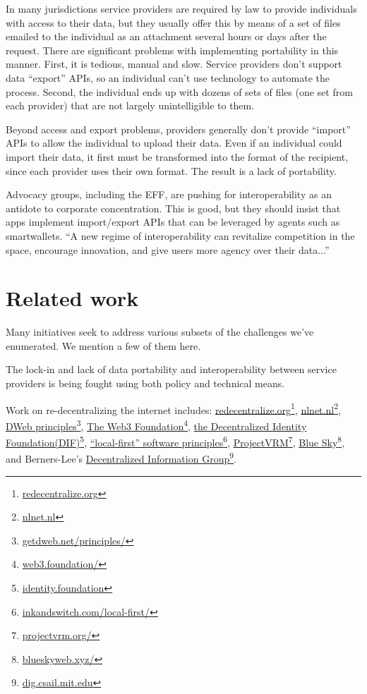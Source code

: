\documentclass[11pt, oneside]{article}   	%
\newcommand{\hyperfootnote}[1][]{\def\ArgI{{#1}}\hyperfootnoteRelay}
\newcommand\hyperfootnoteRelay[2][]{\href{#1#2}{\ArgI}\footnote{\href{#1#2}{#2}}}
\begin{document}
In many jurisdictions service providers are required by law to provide individuals with access to their data, but they usually offer this by means of a set of files emailed to the individual as an attachment several hours or days after the request. There are significant problems with implementing portability in this manner. First, it is tedious, manual and slow. Service providers don't support data ``export'' APIs, so an individual can't use technology to automate the process. Second, the individual ends up with dozens of sets of files (one set from each provider) that are not largely unintelligible to them. 

Beyond access and export problems, providers generally don't provide ``import'' APIs to allow the individual to upload their data. Even if an individual could import their data, it first must be transformed into the format of the recipient, since each provider uses their own format. The result is a lack of portability.

Advocacy groups, including the EFF, are pushing for interoperability as an antidote to corporate concentration. This is good, but they should insist that apps implement import/export APIs that can be leveraged by agents such as smartwallets. ``A new regime of interoperability can revitalize competition in the space, encourage innovation, and give users more agency over their data...''\cite{Cyphers2021} 

\section{Related work} %

Many initiatives seek to address various subsets of the challenges we've enumerated. We mention a few of them here.

The lock-in and lack of data portability and interoperability between service providers is being fought using both policy and technical means\cite{Doctorow2021}\cite{Cyphers2021}. 

Work on re-decentralizing the internet includes: \hyperfootnote[redecentralize.org][https://]{redecentralize.org}, \hyperfootnote[nlnet.nl][https://]{nlnet.nl}, \hyperfootnote[DWeb principles][https://]{getdweb.net/principles/}, \hyperfootnote[The Web3 Foundation][https://]{web3.foundation/}, \hyperfootnote[the Decentralized Identity Foundation(DIF)][https://]{identity.foundation}, \hyperfootnote[``local-first'' software principles][https://]{inkandswitch.com/local-first/}, \hyperfootnote[ProjectVRM][https://]{projectvrm.org/}, \hyperfootnote[Blue Sky][https://]{blueskyweb.xyz/}, and Berners-Lee's \hyperfootnote[Decentralized Information Group][https://]{dig.csail.mit.edu}. 
\end{document}
